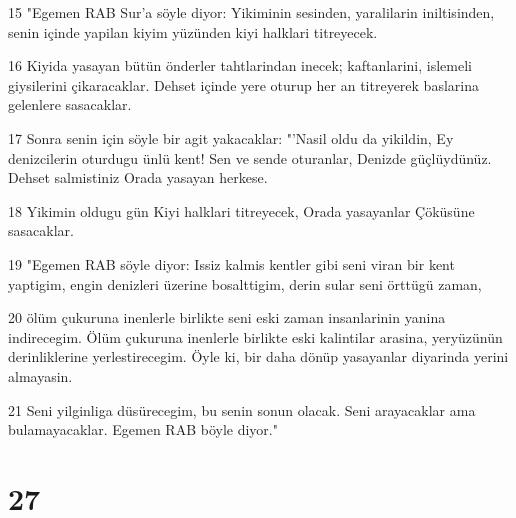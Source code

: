 \par 15 "Egemen RAB Sur'a söyle diyor: Yikiminin sesinden, yaralilarin iniltisinden, senin içinde yapilan kiyim yüzünden kiyi halklari titreyecek.
\par 16 Kiyida yasayan bütün önderler tahtlarindan inecek; kaftanlarini, islemeli giysilerini çikaracaklar. Dehset içinde yere oturup her an titreyerek baslarina gelenlere sasacaklar.
\par 17 Sonra senin için söyle bir agit yakacaklar: "'Nasil oldu da yikildin, Ey denizcilerin oturdugu ünlü kent! Sen ve sende oturanlar, Denizde güçlüydünüz. Dehset salmistiniz Orada yasayan herkese.
\par 18 Yikimin oldugu gün Kiyi halklari titreyecek, Orada yasayanlar Çöküsüne sasacaklar.
\par 19 "Egemen RAB söyle diyor: Issiz kalmis kentler gibi seni viran bir kent yaptigim, engin denizleri üzerine bosalttigim, derin sular seni örttügü zaman,
\par 20 ölüm çukuruna inenlerle birlikte seni eski zaman insanlarinin yanina indirecegim. Ölüm çukuruna inenlerle birlikte eski kalintilar arasina, yeryüzünün derinliklerine yerlestirecegim. Öyle ki, bir daha dönüp yasayanlar diyarinda yerini almayasin.
\par 21 Seni yilginliga düsürecegim, bu senin sonun olacak. Seni arayacaklar ama bulamayacaklar. Egemen RAB böyle diyor."

\chapter{27}

